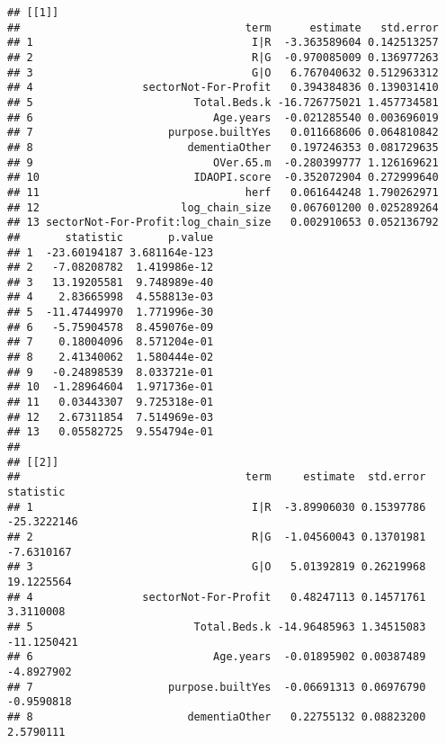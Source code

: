 \documentclass[]{article}
\newenvironment{Shaded}{\begin{snugshade}}{\end{snugshade}}
\newcommand{\KeywordTok}[1]{\textcolor[rgb]{0.13,0.29,0.53}{\textbf{{#1}}}}
\newcommand{\DataTypeTok}[1]{\textcolor[rgb]{0.13,0.29,0.53}{{#1}}}
\newcommand{\StringTok}[1]{\textcolor[rgb]{0.31,0.60,0.02}{{#1}}}
\newcommand{\NormalTok}[1]{{#1}}
\begin{document}
\begin{Shaded}
\end{Shaded}

\begin{verbatim}
## [[1]]
##                                   term      estimate   std.error
## 1                                  I|R  -3.363589604 0.142513257
## 2                                  R|G  -0.970085009 0.136977263
## 3                                  G|O   6.767040632 0.512963312
## 4                 sectorNot-For-Profit   0.394384836 0.139031410
## 5                         Total.Beds.k -16.726775021 1.457734581
## 6                            Age.years  -0.021285540 0.003696019
## 7                     purpose.builtYes   0.011668606 0.064810842
## 8                        dementiaOther   0.197246353 0.081729635
## 9                            OVer.65.m  -0.280399777 1.126169621
## 10                        IDAOPI.score  -0.352072904 0.272999640
## 11                                herf   0.061644248 1.790262971
## 12                      log_chain_size   0.067601200 0.025289264
## 13 sectorNot-For-Profit:log_chain_size   0.002910653 0.052136792
##       statistic       p.value
## 1  -23.60194187 3.681164e-123
## 2   -7.08208782  1.419986e-12
## 3   13.19205581  9.748989e-40
## 4    2.83665998  4.558813e-03
## 5  -11.47449970  1.771996e-30
## 6   -5.75904578  8.459076e-09
## 7    0.18004096  8.571204e-01
## 8    2.41340062  1.580444e-02
## 9   -0.24898539  8.033721e-01
## 10  -1.28964604  1.971736e-01
## 11   0.03443307  9.725318e-01
## 12   2.67311854  7.514969e-03
## 13   0.05582725  9.554794e-01
## 
## [[2]]
##                                   term     estimate  std.error   statistic
## 1                                  I|R  -3.89906030 0.15397786 -25.3222146
## 2                                  R|G  -1.04560043 0.13701981  -7.6310167
## 3                                  G|O   5.01392819 0.26219968  19.1225564
## 4                 sectorNot-For-Profit   0.48247113 0.14571761   3.3110008
## 5                         Total.Beds.k -14.96485963 1.34515083 -11.1250421
## 6                            Age.years  -0.01895902 0.00387489  -4.8927902
## 7                     purpose.builtYes  -0.06691313 0.06976790  -0.9590818
## 8                        dementiaOther   0.22755132 0.08823200   2.5790111

\end{verbatim}
\end{document}
